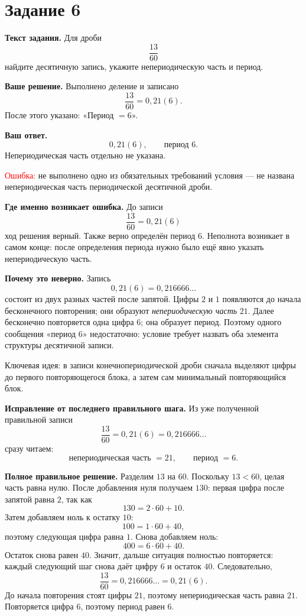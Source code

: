 \documentclass[12pt,a4paper]{article}
\begin{document}
\label{task:6}
\section*{Задание 6}

\textbf{Текст задания.}
Для дроби
\[
\frac{13}{60}
\]
найдите десятичную запись, укажите непериодическую часть и период.

\textbf{Ваше решение.}
Выполнено деление и записано
\[
\frac{13}{60}=0{,}21(6).
\]
После этого указано: «Период $=6$».

\textbf{Ваш ответ.}
\[
0{,}21(6), \qquad \text{период }6.
\]
Непериодическая часть отдельно не указана.

\textcolor{red}{Ошибка:} не выполнено одно из обязательных требований условия --- не названа непериодическая часть периодической десятичной дроби.

\textbf{Где именно возникает ошибка.}
До записи
\[
\frac{13}{60}=0{,}21(6)
\]
ход решения верный. Также верно определён период $6$.
Неполнота возникает в самом конце: после определения периода нужно было ещё явно указать непериодическую часть.

\textbf{Почему это неверно.}
Запись
\[
0{,}21(6)=0{,}216666\ldots
\]
состоит из двух разных частей после запятой.
Цифры $2$ и $1$ появляются до начала бесконечного повторения; они образуют \emph{непериодическую часть} $21$.
Далее бесконечно повторяется одна цифра $6$; она образует период.
Поэтому одного сообщения «период $6$» недостаточно: условие требует назвать оба элемента структуры десятичной записи.

\textcolor{blue!60!black}{Ключевая идея:} в записи конечнопериодической дроби сначала выделяют цифры до первого повторяющегося блока, а затем сам минимальный повторяющийся блок.

\textbf{Исправление от последнего правильного шага.}
Из уже полученной правильной записи
\[
\frac{13}{60}=0{,}21(6)=0{,}216666\ldots
\]
сразу читаем:
\[
\text{непериодическая часть }=21,
\qquad
\text{период }=6.
\]

\textbf{Полное правильное решение.}
Разделим $13$ на $60$.
Поскольку $13<60$, целая часть равна нулю.
После добавления нуля получаем $130$: первая цифра после запятой равна $2$, так как
\[
130=2\cdot 60+10.
\]
Затем добавляем ноль к остатку $10$:
\[
100=1\cdot60+40,
\]
поэтому следующая цифра равна $1$.
Снова добавляем ноль:
\[
400=6\cdot60+40.
\]
Остаток снова равен $40$. Значит, дальше ситуация полностью повторяется: каждый следующий шаг снова даёт цифру $6$ и остаток $40$.
Следовательно,
\[
\frac{13}{60}=0{,}216666\ldots=0{,}21(6).
\]
До начала повторения стоят цифры $21$, поэтому непериодическая часть равна $21$. Повторяется цифра $6$, поэтому период равен $6$.
\end{document}
